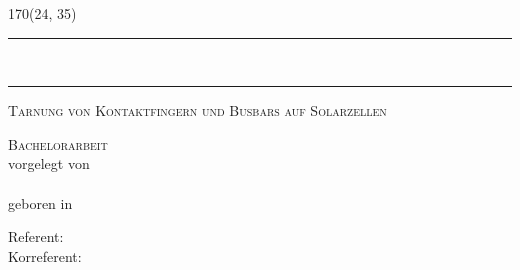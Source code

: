 \setlength{\TPHorizModule}{1mm}
\setlength{\TPVertModule}{1mm}

\begin{titlepage}

  \begin{textblock}{170}(24, 35)
    \begin{center}
        \rule{170mm}{1.5pt}\\[0.5cm]
        {\fontsize{25}{28}\selectfont \textls[40]{\textsc{\inftitle}}\par}
        \vspace{0.5cm}
        \rule{170mm}{1.5pt}

        \vspace{1.5cm}

        \textsc{\large{Tarnung von Kontaktfingern und Busbars auf Solarzellen}}\\
        \vspace{1.5cm}
        \begin{center}
        \end{center}
        \vspace{1.5cm}
       
      \textsc{\Large{Bachelorarbeit}}\\[1.5cm]
      vorgelegt von\\[1cm]
      \inflongauthor\\
      geboren in \infplaceofbirth\\[3cm]

      \begin{minipage}{87mm}
          \begin{flushright}
              \normalsize
              Referent:\\
              Korreferent:
          \end{flushright}
      \end{minipage}
      \hfill
      \begin{minipage}{80mm}
          \begin{flushleft}
              \normalsize
              \infreferee\\
              \infrefereetwo
          \end{flushleft}
      \end{minipage}

    \end{center}
  \end{textblock}

\end{titlepage}
\quad
